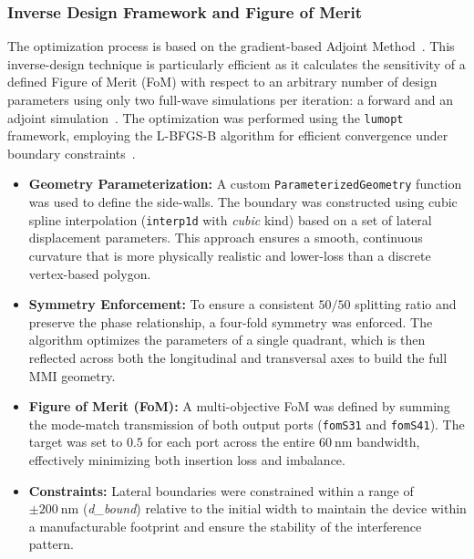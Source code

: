 \subsubsection{Inverse Design Framework and Figure of Merit}

The optimization process is based on the gradient-based Adjoint 
Method~\cite{lalau-keralyShapeOptimizationNanophotonic2014}. This inverse-design technique is 
particularly efficient as it calculates the sensitivity of a defined Figure of Merit (FoM) with 
respect to an arbitrary number of design parameters using only two full-wave simulations per 
iteration: a forward and an adjoint simulation~\cite{piggottInverseDesignDemonstration2015}. 
The optimization was performed using the \texttt{lumopt} framework, employing the L-BFGS-B 
algorithm for efficient convergence under boundary constraints~\cite{byrdLimitedMemoryAlgorithm1995}.


\begin{itemize}
    \item \textbf{Geometry Parameterization:} A custom \texttt{ParameterizedGeometry} 
    function was used to define the side-walls. The boundary was constructed using cubic spline 
    interpolation (\texttt{interp1d} with \textit{cubic} kind) based on a set of lateral 
    displacement parameters. This approach ensures a smooth, continuous curvature that is more 
    physically realistic and lower-loss than a discrete vertex-based polygon.
    \item \textbf{Symmetry Enforcement:} To ensure a consistent $50/50$ splitting ratio and 
    preserve the phase relationship, a four-fold symmetry was enforced. The algorithm optimizes the 
    parameters of a single quadrant, which is then reflected across both the longitudinal and 
    transversal axes to build the full MMI geometry.
    \item \textbf{Figure of Merit (FoM):} A multi-objective FoM was defined by summing the 
    mode-match transmission of both output ports (\texttt{fomS31} and \texttt{fomS41}). The target 
    was set to $0.5$ for each port across the entire $60~\text{nm}$ bandwidth, effectively 
    minimizing both insertion loss and imbalance.
    \item \textbf{Constraints:} Lateral boundaries were constrained within a range of 
    $\pm 200~\text{nm}$ (\textit{d\_bound}) relative to the initial width to maintain the device 
    within a manufacturable footprint and ensure the stability of the interference pattern.
\end{itemize}

